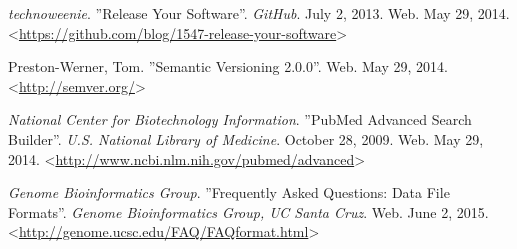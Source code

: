  \textit{technoweenie}. ''Release Your Software''.
\textit{GitHub}. July 2, 2013. Web. May 29, 2014. <\url{https://github.com/blog/1547-release-your-software}>

 Preston-Werner, Tom.  ''Semantic Versioning 2.0.0''. Web.
May 29, 2014. <\url{http://semver.org/}>

 \textit{National Center for Biotechnology
Information}.  ''PubMed Advanced Search Builder''. \textit{U.S. National Library
of Medicine}. October 28, 2009. Web. May 29, 2014. <\url{http://www.ncbi.nlm.nih.gov/pubmed/advanced}>

 \textit{Genome Bioinformatics Group}. ''Frequently Asked Questions: Data File Formats''. \textit{Genome Bioinformatics Group, UC Santa Cruz}. Web. June 2, 2015. <\url{http://genome.ucsc.edu/FAQ/FAQformat.html}> 
